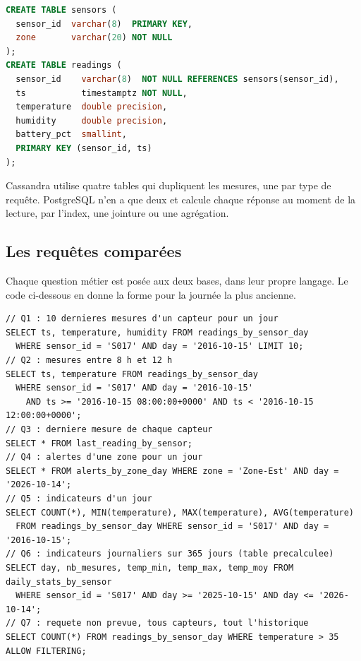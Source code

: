 \documentclass[11pt,a4paper]{article}
\begin{document}
\begin{lstlisting}[language=SQL,caption={Schéma relationnel (PostgreSQL)}]
CREATE TABLE sensors (
  sensor_id  varchar(8)  PRIMARY KEY,
  zone       varchar(20) NOT NULL
);
CREATE TABLE readings (
  sensor_id    varchar(8)  NOT NULL REFERENCES sensors(sensor_id),
  ts           timestamptz NOT NULL,
  temperature  double precision,
  humidity     double precision,
  battery_pct  smallint,
  PRIMARY KEY (sensor_id, ts)
);
\end{lstlisting}

Cassandra utilise quatre tables qui dupliquent les mesures, une par type de requête. PostgreSQL n'en a que deux et calcule chaque réponse au moment de la lecture, par l'index, une jointure ou une agrégation.

\subsection{Les requêtes comparées}
Chaque question métier est posée aux deux bases, dans leur propre langage. Le code ci-dessous en donne la forme pour la journée la plus ancienne.

\begin{lstlisting}[language=CQL,caption={Requêtes du banc d'essai, version Cassandra (CQL)}]
// Q1 : 10 dernieres mesures d'un capteur pour un jour
SELECT ts, temperature, humidity FROM readings_by_sensor_day
  WHERE sensor_id = 'S017' AND day = '2016-10-15' LIMIT 10;
// Q2 : mesures entre 8 h et 12 h
SELECT ts, temperature FROM readings_by_sensor_day
  WHERE sensor_id = 'S017' AND day = '2016-10-15'
    AND ts >= '2016-10-15 08:00:00+0000' AND ts < '2016-10-15 12:00:00+0000';
// Q3 : derniere mesure de chaque capteur
SELECT * FROM last_reading_by_sensor;
// Q4 : alertes d'une zone pour un jour
SELECT * FROM alerts_by_zone_day WHERE zone = 'Zone-Est' AND day = '2026-10-14';
// Q5 : indicateurs d'un jour
SELECT COUNT(*), MIN(temperature), MAX(temperature), AVG(temperature)
  FROM readings_by_sensor_day WHERE sensor_id = 'S017' AND day = '2016-10-15';
// Q6 : indicateurs journaliers sur 365 jours (table precalculee)
SELECT day, nb_mesures, temp_min, temp_max, temp_moy FROM daily_stats_by_sensor
  WHERE sensor_id = 'S017' AND day >= '2025-10-15' AND day <= '2026-10-14';
// Q7 : requete non prevue, tous capteurs, tout l'historique
SELECT COUNT(*) FROM readings_by_sensor_day WHERE temperature > 35 ALLOW FILTERING;
\end{lstlisting}
\end{document}
